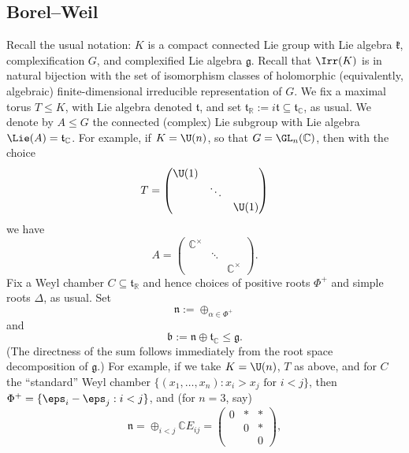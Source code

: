 \documentclass[reqno]{amsart} 
\begin{document}
\subsection{Borel--Weil} \label{sec:borel-weil}
Recall the usual notation: $K$ is a compact connected Lie group with Lie algebra $\mathfrak{k}$, complexification $G$, and complexified Lie algebra $\mathfrak{g}$.  Recall that $\Irr(K)$ is in natural bijection with the set of isomorphism classes of holomorphic (equivalently, algebraic) finite-dimensional irreducible representation of $G$.  We fix a maximal torus $T \leq K$, with Lie algebra denoted $\mathfrak{t}$, and set $\mathfrak{t}_{\mathbb{R}} := i \mathfrak{t} \subseteq \mathfrak{t} _{\mathbb{C}}$, as usual.  We denote by $A \leq G$ the connected (complex) Lie subgroup with Lie algebra $\Lie(A) = \mathfrak{t}_{\mathbb{C}}$.  For example, if $K = \U(n)$, so that $G = \GL_n(\mathbb{C})$, then with the choice
\begin{equation*}
  T = 
\begin{pmatrix}
    \U(1) &  &  \\
    & \ddots &  \\
    & & \U(1)
  \end{pmatrix}
\end{equation*}
we have
\begin{equation*}
  A = 
\begin{pmatrix}
    \mathbb{C}^\times &  &  \\
    & \ddots &  \\
    & & \mathbb{C}^\times
  \end{pmatrix}
.
\end{equation*}
Fix a Weyl chamber $C \subseteq \mathfrak{t}_{\mathbb{R}}$ and hence choices of positive roots $\Phi^+$ and simple roots $\Delta$, as usual.  Set
\begin{equation*}
  \mathfrak{n} := \oplus_{\alpha \in \Phi^+}
\end{equation*}
and
\begin{equation*}
  \mathfrak{b} := \mathfrak{n} \oplus \mathfrak{t}_{\mathbb{C}} \leq \mathfrak{g}.
\end{equation*}
(The directness of the sum follows immediately from the root space decomposition of $\mathfrak{g}$.)  For example, if we take $K = \U(n)$, $T$ as above, and for $C$ the ``standard'' Weyl chamber $\{(x_1,\dotsc,x_n) : x_i > x_j \text{ for } i < j \}$, then $\Phi^+ = \{\eps_i - \eps_j : i < j\}$, and (for $n=3$, say)
\begin{equation*}
  \mathfrak{n} = \oplus_{i < j} \mathbb{C} E_{i j } = 
\begin{pmatrix}
    0 & \ast & \ast \\
    & 0 & \ast \\
    & & 0
  \end{pmatrix}
,
\end{equation*}
\end{document}
